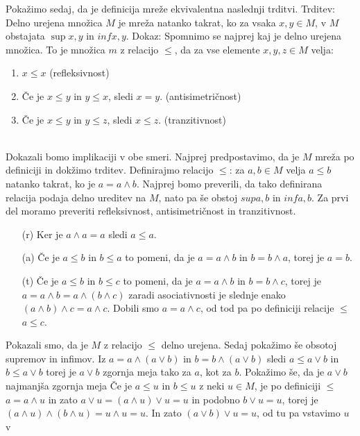 Pokažimo sedaj, da je definicija mreže ekvivalentna naslednji trditvi.
Trditev: Delno urejena množica $M$ je mreža natanko takrat, ko za vsaka $x,y \in M$, v $M$ obstajata $\sup{x,y}$ in 
$inf{x,y}$.
Dokaz: Spomnimo se najprej kaj je delno urejena množica. To je množica $m$ z relacijo $\leq$, da za vse elemente 
$x,y, z \in M$ velja: \begin{enumerate}
    \item $x \leq x$ (refleksivnost)
    \item Če je $x \leq y$ in $y \leq x$, sledi $x = y$. (antisimetričnost)
    \item Če je $x \leq y$ in $y \leq z$, sledi $x \leq z$. (tranzitivnost)
\end{enumerate}\\
Dokazali bomo implikaciji v obe smeri. Najprej predpostavimo, da je $M$ mreža po definiciji in dokžimo trditev. 
Definirajmo relacijo $\leq$: za $a, b \in M$ velja $a \leq b$ natanko takrat, ko je $a = a \wedge b$. 
Najprej bomo preverili, da tako definirana relacija podaja delno ureditev na $M$, nato pa še obstoj $sup{a,b}$ in 
$inf{a,b}$.
Za prvi del moramo preveriti refleksivnost, antisimetričnost in tranzitivnost. 
\begin{itemize}
    \item[(r)] Ker je $a \wedge a = a$ sledi $a \leq a$.
    \item[(a)] Če je $a\leq b$ in $b \leq a$ to pomeni, da je $a = a \wedge b$ in $b = b \wedge a$, torej je $a = b$.
    \item[(t)] Če je  $a\leq b$ in $b \leq c$ to pomeni, da je $a = a \wedge b$ in $b = b \wedge c$, torej je 
    $a = a\wedge b = a\wedge \left(b \wedge c\right)$ zaradi asociativnosti je slednje enako $\left(a \wedge b\right) 
    \wedge c = a \wedge c$. Dobili smo $a = a \wedge c$, od tod pa po definiciji relacije $\leq$ $a \leq c$.
\end{itemize}
Pokazali smo, da je $M$ z relacijo $\leq$ delno urejena. Sedaj pokažimo še obsotoj supremov in infimov. 
Iz $a = a \wedge \left(a \vee b\right)$ in $b = b \wedge \left(a \vee b\right)$ sledi $ a \leq a \vee b$ in $ b \leq
a \vee b$ torej je $a \vee b$ zgornja meja tako za $a$, kot za $b$. Pokažimo še, da je $a \vee b$ najmanjša zgornja meja
Če je $a \leq u$ in $b \leq u$ z neki $u \in M$, je po definiciji $\leq$ $a = a \wedge u$ in zato $a \vee u = 
\left(a \wedge u \right) \vee u = u$ in podobno $b \vee u = u$, torej je $\left(a \wedge u\right) \wedge 
\left(b \wedge u\right) = u \wedge u = u$. In zato $\left(a \vee b \right) \vee u = u$, od tu pa vstavimo $u$ v
